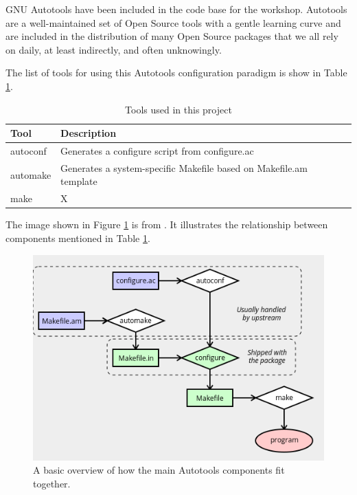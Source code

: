 \justifying
GNU Autotools have been included in the code base for the workshop. Autotools are a well-maintained set of Open Source tools with a gentle learning curve and are included in the distribution of many Open Source packages that we all rely on daily, at least indirectly, and often unknowingly.

\justifying
The list of tools for using this Autotools configuration paradigm is show in Table \ref{Autotools}.
\vspace{2mm}

\begin{table}[ht]
	\centering
	\begin{tabular}{|l|l|}\hline
		Tool & Description \\\hline
		autoconf & Generates a configure script from configure.ac   \\\hline
		automake & Generates a system-specific Makefile based on Makefile.am template    \\\hline
		make  &   X    \\\hline
	\end{tabular}
	\caption{Tools used in this project}
	\label{Autotools}
\end{table}
\vspace{2mm}

\justifying
The image shown in Figure \ref{diagram} is from \cite{autobasics}.
It illustrates the relationship between components mentioned in Table \ref{Autotools}.
\vspace{2mm}

\begin{figure}[ht]
	\includegraphics[width=12cm]{images/diagram.png}
	\caption{A basic overview of how the main Autotools components fit together.}
	\label{diagram}
\end{figure}
\vspace{2mm}

